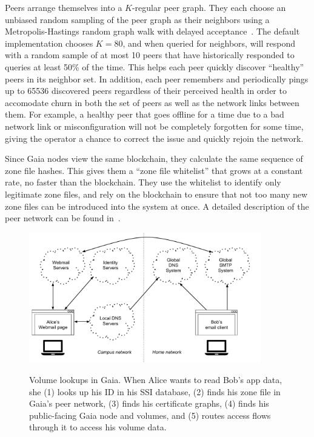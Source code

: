 Peers arrange themselves into a $K$-regular peer graph.  They each choose an
unbiased random sampling of the peer graph as their neighbors using a
Metropolis-Hastings random graph walk with delayed acceptance~\cite{lee-xu-eun}.
The default implementation chooses $K=80$, and when queried for neighbors, will
respond with a random sample of at most 10 peers that
have historically responded to queries at least 50\% of the time.  This helps
each peer quickly discover ``healthy'' peers in its neighbor set.  In addition,
each peer remembers and periodically pings up to 65536 discovered
peers regardless of their perceived health in order to accomodate churn in both
the set of peers as well as the network links between them.  For example, a
healthy peer that goes offline for a time due to a bad network link or
misconfiguration will not be completely forgotten for some time, giving the
operator a chance to correct the issue and quickly rejoin the network.

Since Gaia nodes view the same blockchain, they calculate the same sequence of zone
file hashes.  This gives them a ``zone file whitelist'' that grows at a constant
rate, no faster than the blockchain.  They use the whitelist to identify only
legitimate zone files, and rely on the blockchain to ensure that not too many
new zone files can be introduced into the system at once.  A detailed
description of the peer network can be found in~\cite{ali2017}.

\begin{figure}[h]
   \caption{Volume lookups in Gaia.  When Alice wants to read Bob's app data, she
   (1) looks up his ID in his SSI database, (2) finds his zone file in
   Gaia's peer network, (3) finds his certificate graphs, (4) finds his
   public-facing Gaia node and volumes, and (5) routes access flows through it
   to access his volume data.}
   \centering
   \includegraphics[width=0.9\textwidth,page=18]{figures/dissertation-figures}
   \label{fig:chap3-gaia-volume-lookups}
\end{figure}

